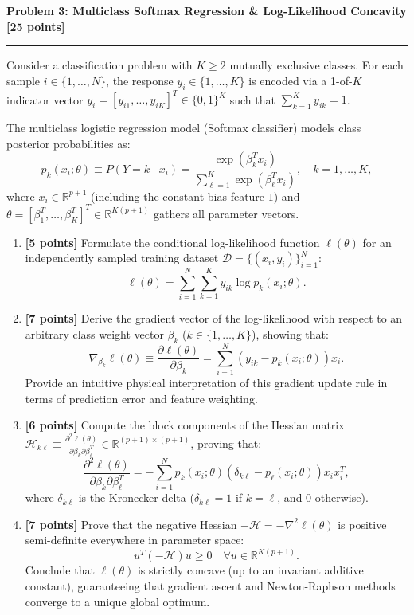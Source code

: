 \documentclass[11pt,a4paper]{article}
\newcommand{\problemheader}[2]{%
  \noindent
  \begin{minipage}{\textwidth}
    {\large\bfseries\textcolor{utblue}{#1}}\hfill
    {\large\bfseries\textcolor{utblue}{#2}}\\[3pt]
    \textcolor{utblue}{\rule{\textwidth}{1pt}}
  \end{minipage}%
  \par\vspace{8pt}
}
\begin{document}
\newpage

\problemheader{Problem 3: Multiclass Softmax Regression \& Log-Likelihood Concavity}{[25 points]}

Consider a classification problem with $K \ge 2$ mutually exclusive classes. For each sample $i \in \{1, \dots, N\}$, the response $y_i \in \{1, \dots, K\}$ is encoded via a 1-of-$K$ indicator vector $y_i = [y_{i1}, \dots, y_{iK}]^T \in \{0, 1\}^K$ such that $\sum_{k=1}^K y_{ik} = 1$.

The multiclass logistic regression model (Softmax classifier) models class posterior probabilities as:
\[
  p_k(x_i; \theta) \equiv P(Y = k \mid x_i) = \frac{\exp(\beta_k^T x_i)}{\sum_{\ell=1}^K \exp(\beta_\ell^T x_i)}, \quad k = 1, \dots, K,
\]
where $x_i \in \mathbb{R}^{p+1}$ (including the constant bias feature $1$) and $\theta = [\beta_1^T, \dots, \beta_K^T]^T \in \mathbb{R}^{K(p+1)}$ gathers all parameter vectors.

\begin{enumerate}[label=(\alph*), itemsep=5pt, leftmargin=18pt]
  \item \textbf{[5 points]} Formulate the conditional log-likelihood function $\ell(\theta)$ for an independently sampled training dataset $\mathcal{D} = \{(x_i, y_i)\}_{i=1}^N$:
  \[
    \ell(\theta) = \sum_{i=1}^N \sum_{k=1}^K y_{ik} \log p_k(x_i; \theta).
  \]

  \item \textbf{[7 points]} Derive the gradient vector of the log-likelihood with respect to an arbitrary class weight vector $\beta_k$ ($k \in \{1, \dots, K\}$), showing that:
  \[
    \nabla_{\beta_k} \ell(\theta) \equiv \frac{\partial \ell(\theta)}{\partial \beta_k} = \sum_{i=1}^N \left( y_{ik} - p_k(x_i; \theta) \right) x_i.
  \]
  Provide an intuitive physical interpretation of this gradient update rule in terms of prediction error and feature weighting.

  \item \textbf{[6 points]} Compute the block components of the Hessian matrix $\mathcal{H}_{k\ell} \equiv \frac{\partial^2 \ell(\theta)}{\partial \beta_k \partial \beta_\ell^T} \in \mathbb{R}^{(p+1) \times (p+1)}$, proving that:
  \[
    \frac{\partial^2 \ell(\theta)}{\partial \beta_k \partial \beta_\ell^T} = -\sum_{i=1}^N p_k(x_i; \theta) \left( \delta_{k\ell} - p_\ell(x_i; \theta) \right) x_i x_i^T,
  \]
  where $\delta_{k\ell}$ is the Kronecker delta ($\delta_{k\ell} = 1$ if $k = \ell$, and $0$ otherwise).

  \item \textbf{[7 points]} Prove that the negative Hessian $-\mathcal{H} = -\nabla^2 \ell(\theta)$ is positive semi-definite everywhere in parameter space:
  \[
    u^T (-\mathcal{H}) u \ge 0 \quad \forall u \in \mathbb{R}^{K(p+1)}.
  \]
  Conclude that $\ell(\theta)$ is strictly concave (up to an invariant additive constant), guaranteeing that gradient ascent and Newton-Raphson methods converge to a unique global optimum.
\end{enumerate}
\end{document}
